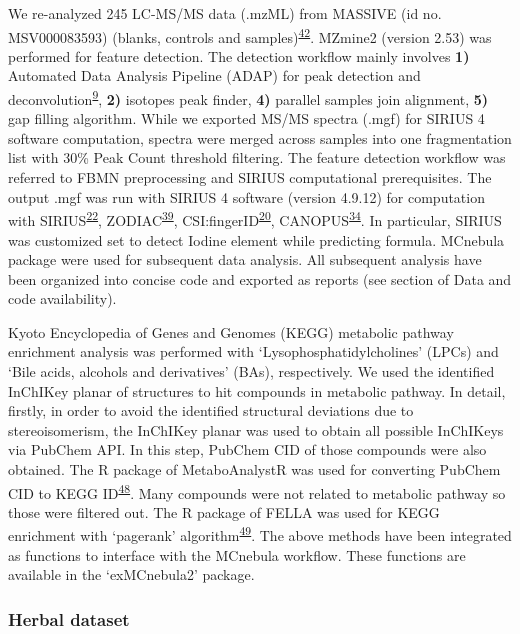 \documentclass[
]{article}
\begin{document}
We re-analyzed 245 LC-MS/MS data (.mzML) from MASSIVE (id no.
MSV000083593) (blanks, controls and
samples)\textsuperscript{\protect\hyperlink{ref-2020s}{42}}. MZmine2
(version 2.53) was performed for feature detection. The detection
workflow mainly involves \textbf{1)} Automated Data Analysis Pipeline
(ADAP) for peak detection and
deconvolution\textsuperscript{\protect\hyperlink{ref-2017f}{9}},
\textbf{2)} isotopes peak finder, \textbf{4)} parallel samples join
alignment, \textbf{5)} gap filling algorithm. While we exported MS/MS
spectra (.mgf) for SIRIUS 4 software computation, spectra were merged
across samples into one fragmentation list with 30\% Peak Count
threshold filtering. The feature detection workflow was referred to FBMN
preprocessing and SIRIUS computational prerequisites. The output .mgf
was run with SIRIUS 4 software (version 4.9.12) for computation with
SIRIUS\textsuperscript{\protect\hyperlink{ref-duhrkop_sirius_2019}{22}},
ZODIAC\textsuperscript{\protect\hyperlink{ref-ludwig_database-independent_2020}{39}},
CSI:fingerID\textsuperscript{\protect\hyperlink{ref-duhrkop_searching_2015}{20}},
CANOPUS\textsuperscript{\protect\hyperlink{ref-duhrkop_systematic_2021}{34}}.
In particular, SIRIUS was customized set to detect Iodine element while
predicting formula. MCnebula package were used for subsequent data
analysis. All subsequent analysis have been organized into concise code
and exported as reports (see section of Data and code availability).

Kyoto Encyclopedia of Genes and Genomes (KEGG) metabolic pathway
enrichment analysis was performed with `Lysophosphatidylcholines' (LPCs)
and `Bile acids, alcohols and derivatives' (BAs), respectively. We used
the identified InChIKey planar of structures to hit compounds in
metabolic pathway. In detail, firstly, in order to avoid the identified
structural deviations due to stereoisomerism, the InChIKey planar was
used to obtain all possible InChIKeys via PubChem API. In this step,
PubChem CID of those compounds were also obtained. The R package of
MetaboAnalystR was used for converting PubChem CID to KEGG
ID\textsuperscript{\protect\hyperlink{ref-2020cx}{48}}. Many compounds
were not related to metabolic pathway so those were filtered out. The R
package of FELLA was used for KEGG enrichment with `pagerank'
algorithm\textsuperscript{\protect\hyperlink{ref-2018bj}{49}}. The above
methods have been integrated as functions to interface with the MCnebula
workflow. These functions are available in the `exMCnebula2' package.

\hypertarget{herbal-dataset}{%
\subsubsection{Herbal dataset}\label{herbal-dataset}}
\end{document}
